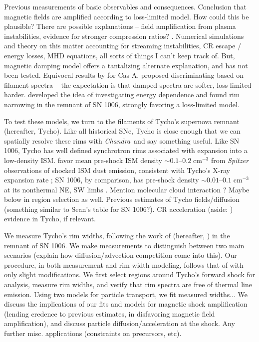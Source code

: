 \documentclass[iop, apj, numberedappendix, twocolappendix]{emulateapj}
\newcommand*{\mt}{\mathrm}
\newcommand*{\unit}[1]{\;\mt{#1}}  %
\newcommand*{\abt}{\mathord{\sim}} %
\newcommand*{\Chandra}{\textit{Chandra}\ }
\begin{document}
Previous measurements of basic observables \citep[e.g.,][]{bamba2003,
bamba2005-hist, bamba2005-vela, parizot2006} and consequences.  Conclusion that
magnetic fields are amplified according to loss-limited model.  How could this
be plausible?  There are possible explanations -- field amplification from
plasma instabilities, evidence for stronger compression ratios?
\citep{blondin2001}.  Numerical simulations and theory on this matter
accounting for streaming instabilities, CR escape / energy losses, MHD
equations, all sorts of things I can't keep track of.  But, magnetic damping
model offers a tantalizing alternate explanation, and has not been tested.
Equivocal results by \citet{araya2010} for Cas A.
\citet{rettig2012} proposed discriminating based on filament spectra -- the
expectation is that damped spectra are softer, loss-limited harder.
\citet{ressler2014} developed the idea of investigating energy dependence and
found rim narrowing in the remnant of SN 1006, strongly favoring a loss-limited
model.

To test these models, we turn to the filaments of Tycho's supernova remnant
(hereafter, Tycho).
Like all historical SNe, Tycho is close enough that we can spatially
resolve these rims with \Chandra and say something useful.  Like SN 1006, Tycho
has well defined synchrotron rims associated with expansion into a low-density
ISM.  \citet{williams2013} favor mean pre-shock ISM density $\abt 0.1$--$0.2
\unit{cm^{-3}}$ from \textit{Spitzer} observations of shocked ISM dust
emission, consistent with Tycho's X-ray expansion rate \citep{katsuda2010}; SN
1006, by comparison, has pre-shock density $\abt 0.01$--$0.1 \unit{cm^{-3}}$ at
its nonthermal NE, SW limbs \citep{acero2007}.
Mention molecular cloud interaction \citep{reynoso1999}? Maybe below in region
selection as well.
Previous estimates of Tycho fields/diffusion (something similar to Sean's table
for SN 1006?).  CR acceleration (aside: \citet{eriksen2011}) evidence in Tycho,
if relevant.

We measure Tycho's rim widths, following the work of \citet{ressler2014}
(hereafter, ) in the remnant of SN 1006.  
We make measurements to distinguish between two main scenarios
(explain how diffusion/advection competition come into this).
Our procedure, in both measurement and rim width modeling, follows that of
 with only slight modifications.
We first select regions around Tycho's forward shock for analysis, measure
rim widths, and verify that rim spectra are free of thermal line emission.
Using two models for particle transport, we fit measured widths...
We discuss the implications of our fits and models for magnetic shock
amplification (lending credence to previous estimates, in disfavoring magnetic
field amplification), and discuss particle diffusion/acceleration at the shock.
Any further misc. applications (constraints on precursors, etc).
\end{document}
